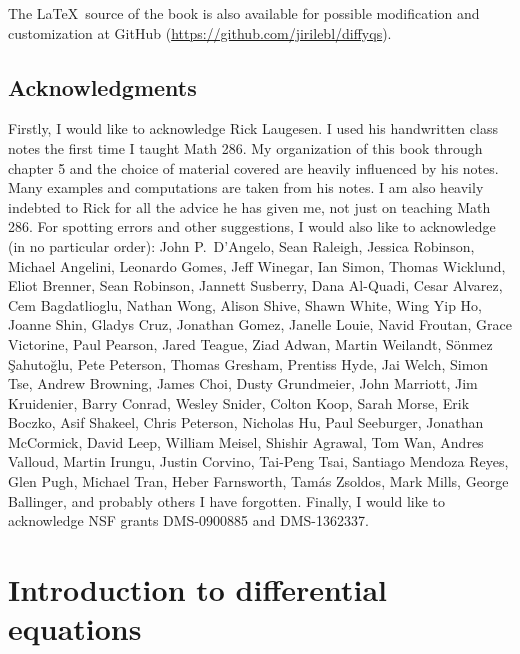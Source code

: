 The \LaTeX\ source of the book is also available
for possible modification and customization
at GitHub (\url{https://github.com/jirilebl/diffyqs}).



\subsection{Acknowledgments}

Firstly, I would like to acknowledge Rick Laugesen.  I used his handwritten
class notes
the first time I taught
Math 286.  My organization of this book through chapter 5
and the choice of
material covered are heavily influenced by his notes.  Many
examples and computations are taken from his notes.  I am also heavily
indebted to Rick for all the advice he has given me, not just on teaching
Math 286.
For spotting errors and other suggestions,
I would also like to acknowledge (in no particular order):
John P.\ D'Angelo,
Sean Raleigh, Jessica Robinson, Michael Angelini, Leonardo Gomes, Jeff
Winegar, Ian Simon, Thomas Wicklund, Eliot Brenner, Sean Robinson,
Jannett Susberry, Dana Al-Quadi, Cesar Alvarez, Cem Bagdatlioglu,
Nathan Wong, Alison Shive, Shawn White, Wing Yip Ho, Joanne Shin,
Gladys Cruz, Jonathan Gomez, Janelle Louie, Navid Froutan,
Grace Victorine, Paul Pearson, Jared Teague, Ziad Adwan,
Martin Weilandt, S\"{o}nmez \c{S}ahuto\u{g}lu,
Pete Peterson, Thomas Gresham, Prentiss Hyde, Jai Welch,
Simon Tse, Andrew Browning, James Choi, Dusty Grundmeier,
John Marriott,
Jim Kruidenier,
Barry Conrad,
Wesley Snider,
Colton Koop,
Sarah Morse,
Erik Boczko,
Asif Shakeel,
Chris Peterson,
Nicholas Hu,
Paul Seeburger,
Jonathan McCormick,
David Leep,
William Meisel,
Shishir Agrawal,
Tom Wan,
Andres Valloud,
Martin Irungu,
Justin Corvino,
Tai-Peng Tsai,
Santiago Mendoza Reyes,
Glen Pugh,
Michael Tran,
Heber Farnsworth,
Tam\'as Zsoldos,
Mark Mills,
George Ballinger,
and probably others I
have forgotten.
Finally, I would like
to acknowledge NSF grants DMS-0900885 and DMS-1362337.



\sectionnewpage
\section{Introduction to differential equations}
\label{introde:section}


